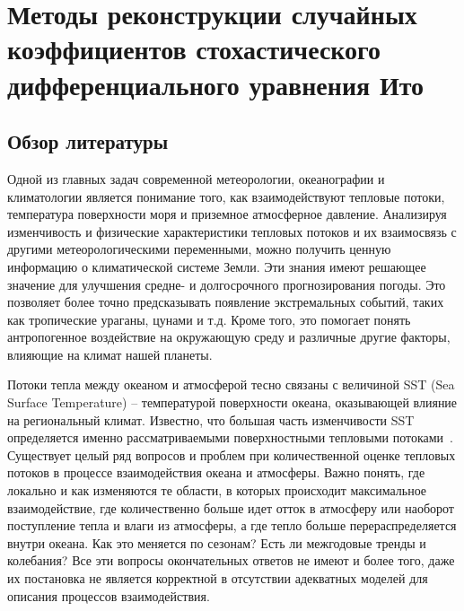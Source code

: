 \chapter{Методы реконструкции случайных коэффициентов стохастического дифференциального уравнения Ито}
\label{ch:Methods}

\section{Обзор литературы}
\label{sec:ch1/Literature}

Одной из главных задач современной метеорологии, океанографии и климатологии является понимание того, как взаимодействуют тепловые потоки, температура поверхности моря и приземное атмосферное давление. Анализируя изменчивость и физические характеристики тепловых потоков и их взаимосвязь с другими метеорологическими переменными, можно получить ценную информацию о климатической системе Земли. Эти знания имеют решающее значение для улучшения средне- и долгосрочного прогнозирования погоды. Это позволяет более точно предсказывать появление экстремальных событий, таких как тропические ураганы, цунами и т.д. Кроме того, это помогает понять антропогенное воздействие на окружающую среду и различные другие факторы, влияющие на климат нашей планеты.

Потоки тепла между океаном и атмосферой тесно связаны с величиной SST (Sea Surface Temperature) -- температурой поверхности океана, оказывающей влияние на региональный климат. Известно, что большая часть изменчивости SST определяется именно рассматриваемыми поверхностными тепловыми потоками~\cite{schneider2015atmospheric,hausmann2017mechanisms,li2019decadal,blein2022parametrizing}. Существует целый ряд вопросов и проблем при количественной оценке тепловых потоков в процессе взаимодействия океана и атмосферы. Важно понять, где локально и как изменяются те области, в которых происходит максимальное взаимодействие, где количественно больше идет отток в атмосферу или наоборот поступление тепла и влаги из атмосферы, а где тепло больше перераспределяется внутри океана. Как это меняется по сезонам? Есть ли межгодовые тренды и колебания? Все эти вопросы окончательных ответов не имеют и более того, даже их постановка не является корректной в отсутствии адекватных моделей для описания процессов взаимодействия.

